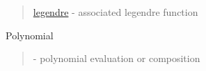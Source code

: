 \begin{quote}
\noindent
\hyperlink{legendre}{legendre} - associated legendre function\\
\end{quote}

Polynomial 

\begin{quote}
\noindent
   - {polynomial evaluation or composition} \\
\end{quote}




 
 
 
 
 
 


